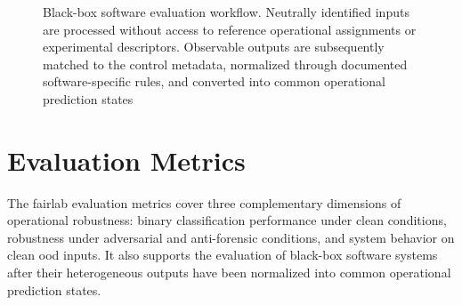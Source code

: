 \begin{figure}[H]
{%
}
\caption[Black-box software evaluation workflow]{Black-box software evaluation
workflow. Neutrally identified inputs are processed without access to reference
operational assignments or experimental descriptors. Observable outputs are
subsequently matched to the control metadata, normalized through documented
software-specific rules, and converted into common operational prediction
states}
\label{fig:methodology-forensic-tool-workflow}
\end{figure}


\section{Evaluation Metrics}
\label{sec:methodology-evaluation-metrics}

The \gls{fairlab} evaluation metrics cover three complementary dimensions of
operational robustness: binary classification performance under clean
conditions, robustness under adversarial and anti-forensic conditions, and
system behavior on clean \gls{ood} inputs. It also supports the evaluation of
black-box software systems after their heterogeneous outputs have been
normalized into common operational prediction states.

